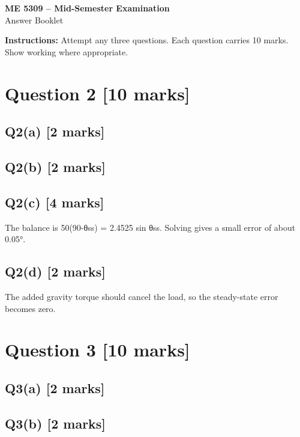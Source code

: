\documentclass[11pt,a4paper]{article}
\begin{document}
\begin{center}
{\Large\bfseries ME 5309 -- Mid-Semester Examination}\\[3pt]
{\large Answer Booklet}\\[8pt]
\end{center}
\textbf{Instructions:} Attempt any three questions. Each question carries 10 marks. Show working where appropriate.
\section*{Question 2 \hfill [10 marks]}
\subsection*{Q2(a) \hfill [2 marks]}

\vspace{2mm}

\subsection*{Q2(b) \hfill [2 marks]}

\vspace{2mm}

\subsection*{Q2(c) \hfill [4 marks]}

The balance is 50(90-θss) = 2.4525 sin θss.
Solving gives a small error of about 0.05°.

\subsection*{Q2(d) \hfill [2 marks]}

The added gravity torque should cancel the load, so the steady-state error becomes zero. 
\section*{Question 3 \hfill [10 marks]}
\subsection*{Q3(a) \hfill [2 marks]}

\vspace{2mm}

\subsection*{Q3(b) \hfill [2 marks]}
\end{document}
